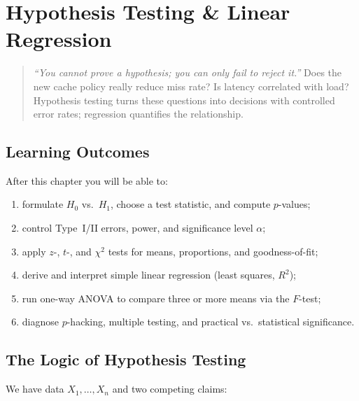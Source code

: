 \chapter{Hypothesis Testing \& Linear Regression}
\label{ch:hypothesis}

\begin{quote}
\emph{``You cannot prove a hypothesis; you can only fail to reject it.''} Does the new cache policy really reduce miss rate? Is latency correlated with load? Hypothesis testing turns these questions into decisions with controlled error rates; regression quantifies the relationship.
\end{quote}

\noindent{}
\vspace{0.4em}

\section*{Learning Outcomes}
After this chapter you will be able to:
\begin{enumerate}[label=(L\arabic*)]
    \item formulate $H_0$ vs.\ $H_1$, choose a test statistic, and compute $p$-values;
    \item control Type~I/II errors, power, and significance level $\alpha$;
    \item apply $z$-, $t$-, and $\chi^2$ tests for means, proportions, and goodness-of-fit;
    \item derive and interpret simple linear regression (least squares, $R^2$);
    \item run one-way ANOVA to compare three or more means via the $F$-test;
    \item diagnose $p$-hacking, multiple testing, and practical vs.\ statistical significance.
\end{enumerate}

\section{The Logic of Hypothesis Testing}
\label{sec:logic-testing}
We have data $X_1,\dots,X_n$ and two competing claims:

